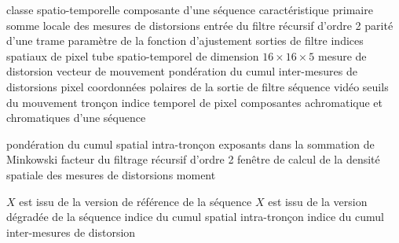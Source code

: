
							{classe spatio-temporelle}
							{composante d'une séquence}
							{caractéristique primaire}
							{somme locale des mesures de distorsions}
							{entrée du filtre récursif d'ordre 2}
							{parité d'une trame}
							{paramètre de la fonction d'ajustement}
						{sorties de filtre}
							{indices spatiaux de pixel}
							{tube spatio-temporel de dimension $16\times16\times5$}
\nomenclature[S]{$\Md$}						{mesure de distorsion}
\nomenclature[S]{$\MV$}						{vecteur de mouvement}
							{pondération du cumul inter-mesures de distorsions}
							{pixel}
				{coordonnées polaires de la sortie de filtre}
							{séquence vidéo}
\nomenclature[S]{$\SMVB,\,\SMVH$}		{seuils du mouvement}
							{tronçon}
							{indice temporel de pixel}
				{composantes achromatique et chromatiques d'une séquence}



\nomenclature[S]{$\alpha$}						{pondération du cumul spatial intra-tronçon}
\nomenclature[S]{$\beta_{\SIT}, \beta_{\ID}$}	{exposants dans la sommation de Minkowski}
\nomenclature[S]{$\gamma$}						{facteur du filtrage récursif d'ordre 2}
\nomenclature[S]{$\phi$}						{fenêtre de calcul de la densité spatiale des mesures de distorsions}
\nomenclature[S]{$\tau$}						{moment}

							{$X$ est issu de la version de référence de la séquence}
							{$X$ est issu de la version dégradée de la séquence}
					{indice du cumul spatial intra-tronçon}
						{indice du cumul inter-mesures de distorsion}



\markboth{\nomname}{\nomname}
\printnomenclature[2in]
